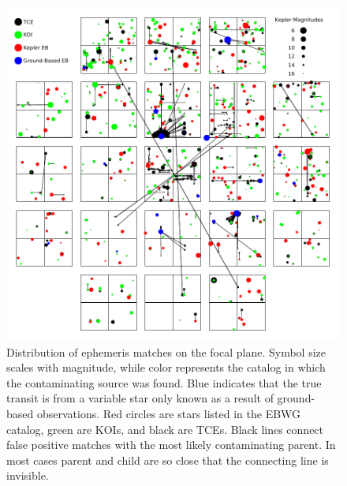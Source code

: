\begin{figure}[h]
\centering
\includegraphics[width=\linewidth]{CCDPlot.pdf}
\caption{Distribution of ephemeris matches on the focal plane. Symbol size scales with magnitude, while color represents the catalog in which the contaminating source was found. Blue indicates that the true transit is from a variable star only known as a result of ground-based observations. Red circles are stars listed in the \kepler{} EBWG catalog, green are KOIs, and black are TCEs. Black lines connect false positive matches with the most likely contaminating parent. In most cases parent and child are so close that the connecting line is invisible.}
\label{ephemmatchfig}
\end{figure}



